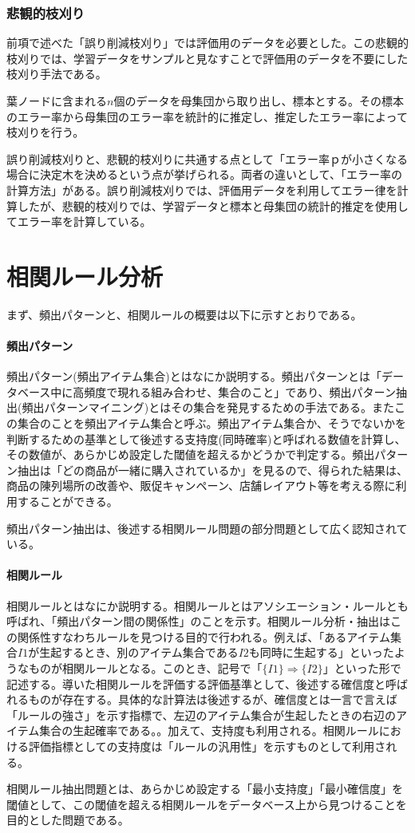 \documentclass[dvipdfmx]{jsarticle}
\begin{document}
\subsubsection{悲観的枝刈り}
前項で述べた「誤り削減枝刈り」では評価用のデータを必要とした。この悲観的枝刈りでは、学習データをサンプルと見なすことで評価用のデータを不要にした枝刈り手法である。\par
葉ノードに含まれる$n$個のデータを母集団から取り出し、標本とする。その標本のエラー率から母集団のエラー率を統計的に推定し、推定したエラー率によって枝刈りを行う。\par
誤り削減枝刈りと、悲観的枝刈りに共通する点として「エラー率ｐが小さくなる場合に決定木を決めるという点が挙げられる。両者の違いとして、「エラー率の計算方法」がある。誤り削減枝刈りでは、評価用データを利用してエラー律を計算したが、悲観的枝刈りでは、学習データと標本と母集団の統計的推定を使用してエラー率を計算している。
\section{相関ルール分析}
まず、頻出パターンと、相関ルールの概要は以下に示すとおりである。
\paragraph{頻出パターン}
頻出パターン(頻出アイテム集合)とはなにか説明する。頻出パターンとは「データベース中に高頻度で現れる組み合わせ、集合のこと」であり、頻出パターン抽出(頻出パターンマイニング)とはその集合を発見するための手法である。またこの集合のことを頻出アイテム集合と呼ぶ。頻出アイテム集合か、そうでないかを判断するための基準として後述する支持度(同時確率)と呼ばれる数値を計算し、その数値が、あらかじめ設定した閾値を超えるかどうかで判定する。頻出パターン抽出は「どの商品が一緒に購入されているか」を見るので、得られた結果は、商品の陳列場所の改善や、販促キャンペーン、店舗レイアウト等を考える際に利用することができる。\par
頻出パターン抽出は、後述する相関ルール問題の部分問題として広く認知されている。
\paragraph{相関ルール}
相関ルールとはなにか説明する。相関ルールとはアソシエーション・ルールとも呼ばれ、「頻出パターン間の関係性」のことを示す。相関ルール分析・抽出はこの関係性すなわちルールを見つける目的で行われる。例えば、「あるアイテム集合$I1$が生起するとき、別のアイテム集合である$I2$も同時に生起する」といったようなものが相関ルールとなる。このとき、記号で「$\{I1\} \Rightarrow \{I2\}$」といった形で記述する。導いた相関ルールを評価する評価基準として、後述する確信度と呼ばれるものが存在する。具体的な計算法は後述するが、確信度とは一言で言えば「ルールの強さ」を示す指標で、左辺のアイテム集合が生起したときの右辺のアイテム集合の生起確率である。。加えて、支持度も利用される。相関ルールにおける評価指標としての支持度は「ルールの汎用性」を示すものとして利用される。\par
相関ルール抽出問題とは、あらかじめ設定する「最小支持度」「最小確信度」を閾値として、この閾値を超える相関ルールをデータベース上から見つけることを目的とした問題である。
\end{document}
